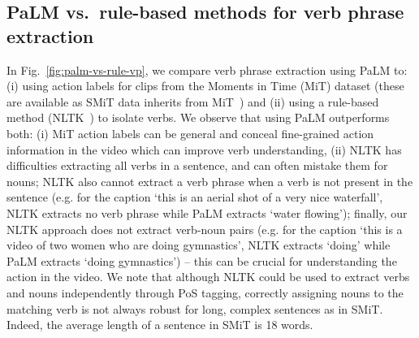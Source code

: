 \subsection{PaLM vs.~rule-based methods for verb phrase extraction}\label{sec:app:palm-comparison-vp}
In Fig.~\ref{fig:palm-vs-rule-vp}, we compare verb phrase extraction using PaLM to:
(i) using action labels for clips from the Moments in Time (MiT) dataset (these are available as SMiT data inherits from MiT~\cite{monfortmoments}) and
(ii) using a rule-based method (NLTK~\cite{bird2009natural}) to isolate verbs. 
We observe that using PaLM outperforms both: (i) MiT action labels can be general and conceal fine-grained action information in the video which can improve verb understanding, (ii) NLTK has difficulties extracting all verbs in a sentence, and can often mistake them for nouns; NLTK also cannot extract a verb phrase when a verb is not present in the sentence (e.g. for the caption `this is an aerial shot of a very nice waterfall', NLTK extracts no verb phrase while PaLM extracts `water flowing'); finally, our NLTK approach does not extract verb-noun pairs (e.g. for the caption `this is a video of two women who are doing gymnastics', NLTK extracts `doing' while PaLM extracts `doing gymnastics') -- this can be crucial for understanding the action in the video. We note that although NLTK could be used to extract verbs and nouns independently through PoS tagging, correctly assigning nouns to the matching verb is not always robust for long, complex sentences as in SMiT. Indeed, the average length of a sentence in SMiT is 18 words. 

